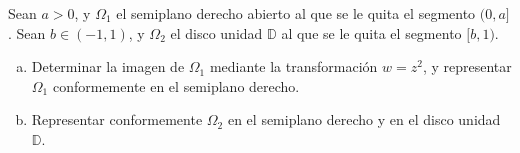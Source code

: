 \documentclass[twoside]{article}
\begin{document}
\begin{ejercicio}{13}
Sean $a>0$, y $\Omega_1$ el semiplano derecho abierto al que se le quita el segmento $(0,a]$. Sean $b\in(-1,1)$, y $\Omega_2$ el disco unidad $\mathbb{D}$ al que se le quita el segmento $[b,1)$.
\begin{enumerate}[(a)]
\item Determinar la imagen de $\Omega_1$ mediante la transformación $w=z^2$, y representar $\Omega_1$ conformemente en el semiplano derecho.
\item Representar conformemente $\Omega_2$ en el semiplano derecho y en el disco unidad $\mathbb{D}$.
\end{enumerate}
\end{ejercicio}
\begin{solucion}
\end{solucion}
\newpage
\end{document}
